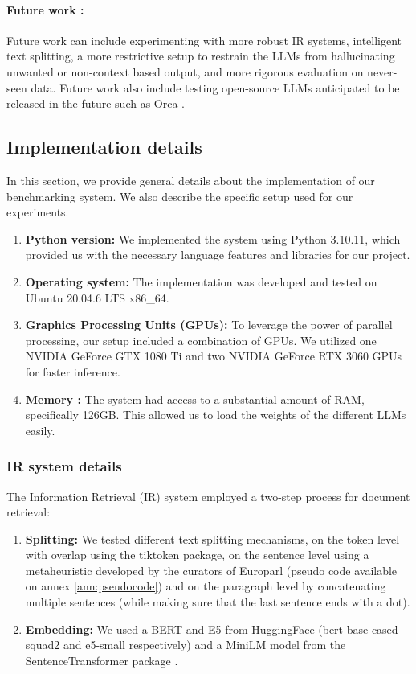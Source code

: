 \documentclass[a4paper,12pt]{article}
\begin{document}
\paragraph{Future work :} 
Future work can include experimenting with more robust IR systems, intelligent text splitting, a more restrictive setup to restrain the LLMs from hallucinating unwanted or non-context based output, 
and more rigorous evaluation on never-seen data. 
Future work also include testing open-source LLMs anticipated to be released in the future such as Orca \cite{orca}. 

\subsection{Implementation details}

In this section, we provide general details about the implementation of our benchmarking system. 
We also describe the specific setup used for our experiments.

\begin{enumerate}
	\item \textbf{Python version:} We implemented the system using Python 3.10.11, which provided us with the necessary language features and libraries for our project.
	\item \textbf{Operating system:} The implementation was developed and tested on Ubuntu 20.04.6 LTS x86\_64.
	\item \textbf{Graphics Processing Units (GPUs):} To leverage the power of parallel processing, our setup included a combination of GPUs. We utilized one NVIDIA GeForce GTX 1080 Ti and two NVIDIA GeForce RTX 3060 GPUs for faster inference.
	\item \textbf{Memory :} The system had access to a substantial amount of RAM, specifically 126GB. This allowed us to load the weights of the different LLMs easily.
\end{enumerate}

\subsubsection*{IR system details}
The Information Retrieval (IR) system employed a two-step process for document retrieval:

\begin{enumerate}
	\item \textbf{Splitting:} We tested different text splitting mechanisms, on the token level with overlap using the tiktoken package, 
    on the sentence level using a metaheuristic developed by the curators of Europarl \cite{europarl} (pseudo code available on annex \ref{ann:pseudocode}) and on the paragraph level by concatenating multiple sentences (while making sure that the last sentence ends with a dot).
	
    \item \textbf{Embedding:} We used a BERT \cite{bert} and E5 \cite{e5} from HuggingFace \cite{huggingface} (bert-base-cased-squad2 and e5-small respectively) and a MiniLM \cite{minilm} model from the SentenceTransformer package \cite{sbert}.
\end{enumerate}
\end{document}
